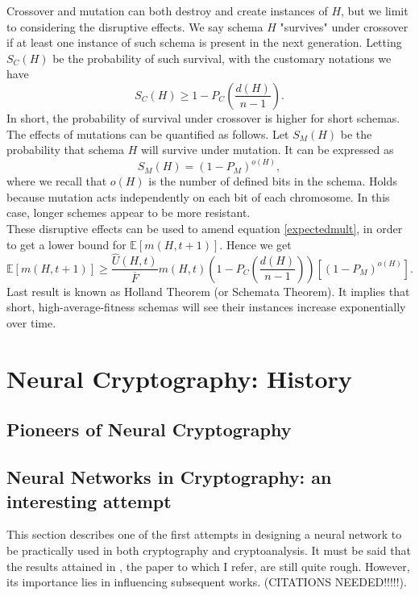 \documentclass[%
    corpo=11pt,
    twoside,
    stile=classica,
    oldstyle,
    autoretitolo,
    tipotesi=magistrale,
    greek,
    evenboxes,
    english
]{toptesi}
\begin{document}
Crossover and mutation can both destroy and create instances of $H$, but we limit to considering the disruptive effects. We say schema $H$ "survives" under crossover if at least one instance of such schema is present in the next generation. Letting $S_C(H)$ be the probability of such survival, with the customary notations we have
\begin{equation}
S_C(H) \geq 1 - P_C\left(\frac{d(H)}{n-1} \right).
\end{equation}
In short, the probability of survival under crossover is higher for short schemas. \\
The effects of mutations can be quantified as follows. Let $S_M(H)$ be the probability that schema $H$ will survive under mutation. It can be expressed as
\begin{equation}
S_M(H) = (1-P_M)^{o(H)},
\end{equation}
where we recall that $o(H)$ is the number of defined bits in the schema. Holds because mutation acts independently on each bit of each chromosome. In this case, longer schemes appear to be more resistant. \\
These disruptive effects can be used to amend equation \eqref{expectedmult}, in order to get a lower bound for $\mathbb{E}\left[m(H, t + 1) \right]$. Hence we get
\begin{equation}
\mathbb{E}\left[m(H, t + 1) \right] \geq \frac{\hat{U}(H,t)}{\overline{F}}m(H,t)\left( 1 - P_C\left(\frac{d(H)}{n-1} \right)\right)\left[ (1-P_M)^{o(H)}\right].
\end{equation}
Last result is known as Holland Theorem (or Schemata Theorem). It implies that short, high-average-fitness schemas will see their instances increase exponentially over time.

\chapter{Neural Cryptography: History}
\section{Pioneers of Neural Cryptography}
\newpage

\section{Neural Networks in Cryptography: an interesting attempt}
This section describes one of the first attempts in designing a neural network to be practically used in both cryptography and cryptoanalysis. It must be said that the results attained in \cite{volna}, the paper to which I refer, are still quite rough. However, its importance lies in influencing subsequent works. (CITATIONS NEEDED!!!!!).
\end{document}
